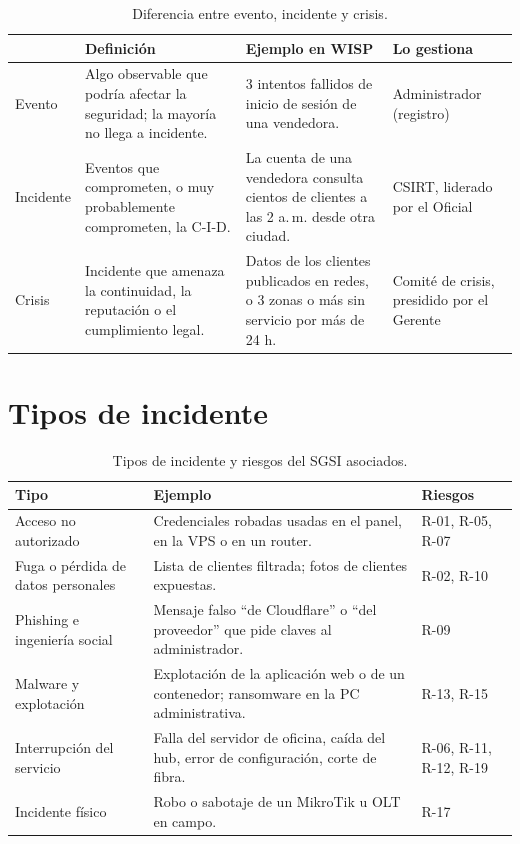 \begin{table}[H]
\centering
\caption{Diferencia entre evento, incidente y crisis.}
\label{tab:anx-inc-niveles}
\small
\begin{tabularx}{\textwidth}{L{1.6cm}XXL{2.6cm}}
\toprule
& \textbf{Definición} & \textbf{Ejemplo en WISP} & \textbf{Lo gestiona} \\
\midrule
Evento & Algo observable que podría afectar la seguridad; la mayoría no llega a incidente. & 3 intentos fallidos de inicio de sesión de una vendedora. & Administrador (registro) \\
Incidente & Eventos que comprometen, o muy probablemente comprometen, la C-I-D. & La cuenta de una vendedora consulta cientos de clientes a las 2 a.\,m. desde otra ciudad. & CSIRT, liderado por el Oficial \\
Crisis & Incidente que amenaza la continuidad, la reputación o el cumplimiento legal. & Datos de los clientes publicados en redes, o 3 zonas o más sin servicio por más de 24 h. & Comité de crisis, presidido por el Gerente \\
\bottomrule
\end{tabularx}
\end{table}

\section{Tipos de incidente}

\begin{table}[H]
\centering
\caption{Tipos de incidente y riesgos del SGSI asociados.}
\label{tab:anx-inc-tipos}
\small
\begin{tabularx}{\textwidth}{L{3.4cm}XL{2.4cm}}
\toprule
\textbf{Tipo} & \textbf{Ejemplo} & \textbf{Riesgos} \\
\midrule
Acceso no autorizado & Credenciales robadas usadas en el panel, en la VPS o en un router. & R-01, R-05, R-07 \\
Fuga o pérdida de datos personales & Lista de clientes filtrada; fotos de clientes expuestas. & R-02, R-10 \\
Phishing e ingeniería social & Mensaje falso ``de Cloudflare'' o ``del proveedor'' que pide claves al administrador. & R-09 \\
Malware y explotación & Explotación de la aplicación web o de un contenedor; ransomware en la PC administrativa. & R-13, R-15 \\
Interrupción del servicio & Falla del servidor de oficina, caída del hub, error de configuración, corte de fibra. & R-06, R-11, R-12, R-19 \\
Incidente físico & Robo o sabotaje de un MikroTik u OLT en campo. & R-17 \\
\bottomrule
\end{tabularx}
\end{table}

